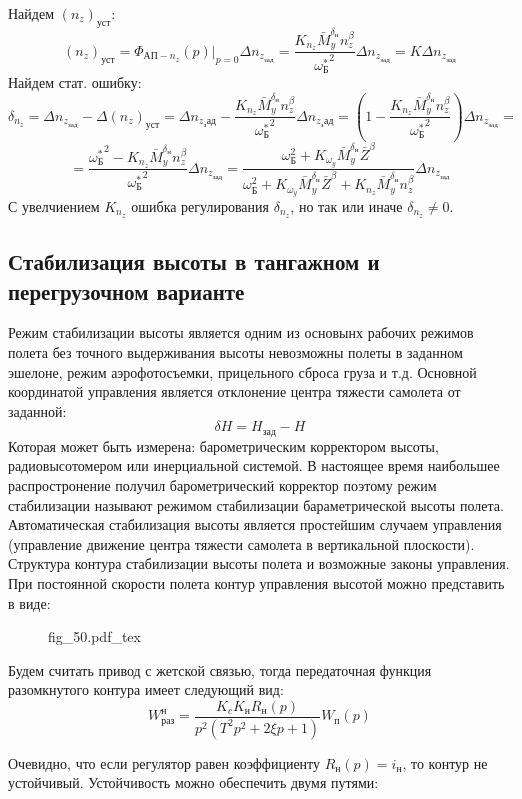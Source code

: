 \documentclass{article}
\newcommand{\incfig}[1]{
    {#1.pdf_tex}
}
\begin{document}
Найдем $(n_z)_{уст}$:
\[
(n_z)_{уст} = \Phi_{АП-n_z}(p) |_{p=0} \Delta n_{z_{зад}} =\frac{K_{n_z} \bar{M}_y^{\delta_н} n_z^\beta}{{\omega_Б^*}^2} \Delta n_{z_{зад}} = K \Delta n_{z_{зад}}
\]
Найдем стат. ошибку:
\[
    \delta_{n_z} = \Delta n_{z_{зад}} - \Delta (n_z)_{уст} = \Delta n_{z_зад} - \frac{K_{n_z} \bar{M}_y^{\delta_н}n_z^\beta}{{\omega_Б^*}^2} \Delta n_{z_зад} = \left( 1 - \frac{ K_{n_z} \bar{M}_y^{\delta_н} n_z^\beta}{{\omega_Б^*}^2} \right) \Delta n_{z_{зад}} = 
\]
\[
    = \frac{{\omega_Б^*}^2 - K_{n_z} \bar{M}_y^{\delta_н} n_z^\beta}{ {\omega_Б^*}^2} \Delta n_{z_{зад}} = \frac{\omega_Б^2 + K_{\omega_y} \bar{M}_y^{\delta_н} \bar{Z}^\beta}{\omega_Б^2 + K_{\omega_y} \bar{M}_y^{\delta_н} \bar{Z}^\beta + K_{n_z} \bar{M}_y^{\delta_н} n_z^\beta} \Delta n_{z_{зад}}
\]
С увелчиением $K_{n_z}$ ошибка регулирования $\delta_{n_z}$, но так или иначе $\delta_{n_z} \neq 0$.

\subsection{Стабилизация высоты в тангажном и перегрузочном варианте}
Режим стабилизации высоты является одним из основынх рабочих режимов полета без точного выдерживания высоты невозможны полеты в заданном эшелоне, режим аэрофотосъемки, прицельного сброса груза и т.д. Основной координатой управления является отклонение центра тяжести самолета от заданной:
\[
\delta H = H_{зад} - H
\]
Которая может быть измерена: барометрическим корректором высоты, радиовысотомером или инерциальной системой. В настоящее время наибольшее распростронение получил барометрический корректор поэтому режим стабилизации называют режимом стабилизации бараметрической высоты полета. Автоматическая стабилизация высоты является простейшим случаем управления (управление движение центра тяжести самолета в вертикальной плоскости). Структура контура стабилизации высоты полета и возможные законы управления. При постоянной скорости полета контур управления высотой можно представить в виде:

\begin{figure}[H]
    \centering
    \incfig{fig_50}
    \label{fig:fig_50}
\end{figure}

Будем считать привод с жетской связью, тогда передаточная функция разомкнутого контура имеет следующий вид:
\[
W_{раз}^н =\frac{K_c K_н R_н(p)}{p^2(T^2 p^2 + 2 \xi p + 1)}W_п(p)
\]

Очевидно, что если регулятор равен коэффициенту $R_н(p)  = i_н$, то контур не устойчивый.
Устойчивость можно обеспечить двумя путями:
\end{document}
